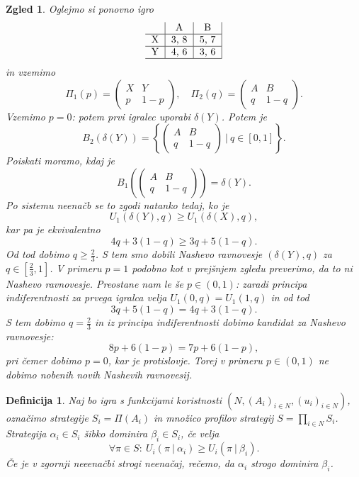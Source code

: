 \documentclass[10pt, a4paper]{article}
\newtheorem{defi}[izr]{Definicija}
\newenvironment{noticeB}{%
  \tcolorbox[%
  notitle,
  empty,
  enhanced,  %
  breakable,
  coltext=black,
  colback=white, 
  fontupper=\rmfamily,
  parbox=false,
  noparskip,
  sharp corners,
  boxrule=-1pt,  %
  frame hidden,
  left=7pt,  %
  right=7pt,
  top=5pt,
  bottom=5pt,
  before skip=2.5ex plus 2pt,
  after skip=2.5ex plus 2pt,
  borderline west = {1.5pt}{-0.1pt}{blue!30!black}, %
  overlay unbroken and last={%
    \draw[color=black, line width=1.25pt]
    ($(frame.south west)+(1.pt, -0.1pt)$) -- ++(2em, 0);
  }
  ]}
{\endtcolorbox}
\newenvironment{definicija}{\begin{defi}\begin{noticeB}}{%
    \end{noticeB}\end{defi}}
\newtheorem{zgled}[izr]{Zgled}
\begin{document}
\begin{zgled}
  Oglejmo si ponovno igro 
  $$
  \begin{tabular}{c|c|c|}
    & \textrm{A} & \textrm{B}\\
    \hline
    \textrm{X} & 3, 8 & 5, 7\\
    \hline
    \textrm{Y} & 4, 6 & 3, 6\\
    \hline
  \end{tabular}
  $$
  in vzemimo 
  $$\Pi_1 (p) = \begin{pmatrix}
    X & Y\\
    p & 1 - p
  \end{pmatrix}, \quad \Pi_2 (q) = \begin{pmatrix}
    A & B\\
    q & 1 - q
  \end{pmatrix}.$$
    Vzemimo $p = 0$: potem prvi igralec uporabi $\delta(Y)$.
  Potem je $$B_2 (\delta(Y)) = \left\lbrace \begin{pmatrix}
    A & B\\
    q & 1 - q
  \end{pmatrix}\ \Big|\ q \in [0, 1] \right\rbrace.$$
  Poiskati moramo, kdaj je $$B_1 \left(\begin{pmatrix}
    A & B\\
    q & 1 - q
  \end{pmatrix}\right) = \delta(Y).$$
  Po sistemu neenačb se to zgodi natanko tedaj, ko je 
  $$U_1 (\delta(Y), q) \geq U_1(\delta(X), q),$$
  kar pa je ekvivalentno 
  $$4q + 3 (1 - q) \geq 3q + 5 (1 - q).$$
  Od tod dobimo $q \geq \frac{2}{3}$.
  S tem smo dobili Nashevo ravnovesje $(\delta(Y), q)$ za $q \in \left[\frac{2}{3}, 1\right]$.
  V primeru $p = 1$ podobno kot v prejšnjem zgledu preverimo, da to ni Nashevo ravnovesje.
  Preostane nam le še $p \in (0, 1)$: zaradi principa indiferentnosti za prvega igralca velja
  $U_1 (0, q) = U_1(1, q)$ in od tod 
  $$3q + 5(1 - q) = 4 q + 3 (1 - q).$$
  S tem dobimo $q = \frac{2}{3}$ in iz principa indiferentnosti dobimo kandidat za Nashevo ravnovesje: 
  $$8p + 6(1 - p) = 7p + 6(1 - p),$$
  pri čemer dobimo $p = 0$, kar je protislovje. Torej v primeru 
  $p \in (0, 1)$ ne dobimo nobenih novih Nashevih ravnovesij. 
\end{zgled}

\begin{definicija}
  Naj bo igra s funkcijami koristnosti $(N, (A_i)_{i \in N}, (u_i)_{i \in N})$, označimo strategije $S_i = \Pi(A_i)$ in množico profilov strategij
   $S = \prod_{i \in N} S_i$.
   Strategija $\alpha_i \in S_i$ šibko dominira $\beta_i \in S_i$, če velja 
   $$\forall \pi \in S:\ U_i (\pi\ |\ \alpha_i) \geq U_i (\pi\ |\ \beta_i).$$
   Če je v zgornji neeenačbi strogi neenačaj, rečemo, da $\alpha_i$ 
   strogo dominira $\beta_i$. 
\end{definicija}
\end{document}
